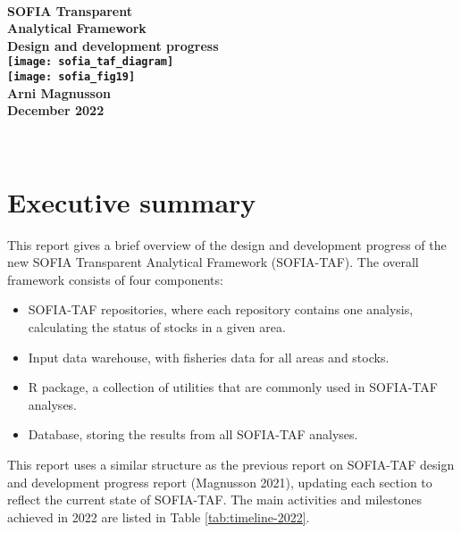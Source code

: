 \documentclass[12pt]{article}
\begin{document}
\thispagestyle{empty}

\begin{center}
  ~\\[0ex]
  \Large\bfseries SOFIA Transparent\\
  Analytical Framework\\[1.5ex]
  \large{\rm Design and development progress}\\[2.6cm]
  \texttt{[image: sofia\_taf\_diagram]}\\[1.5cm]
  \hspace{-1.5ex}\texttt{[image: sofia\_fig19]}\\[1.8cm]
  \mdseries Arni Magnusson\\[1.6ex]
  December 2022
\end{center}

\newpage

~\vspace{1em}
\setcounter{tocdepth}{2}
\tableofcontents

\newpage

\section{Executive summary}

This report gives a brief overview of the design and development progress of the
new SOFIA Transparent Analytical Framework (SOFIA-TAF). The overall framework
consists of four components:\\[-3ex]

\begin{itemize}
  \item SOFIA-TAF repositories, where each repository contains one analysis,
  calculating the status of stocks in a given area.\\[-3.5ex]
  \item Input data warehouse, with fisheries data for all areas and
  stocks.\\[-3.5ex]
  \item R package, a collection of utilities that are commonly used in SOFIA-TAF
  analyses.\\[-3.5ex]
  \item Database, storing the results from all SOFIA-TAF analyses.\\[-3ex]
\end{itemize}

This report uses a similar structure as the previous report on SOFIA-TAF design
and development progress report (Magnusson 2021), updating each section to
reflect the current state of SOFIA-TAF. The main activities and milestones
achieved in 2022 are listed in Table \ref{tab:timeline-2022}.
\end{document}
